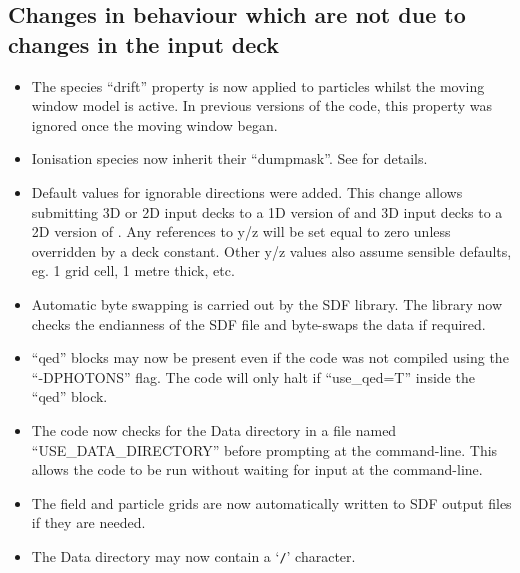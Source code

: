\subsection{Changes in behaviour which are not due to changes in the input deck}
\begin{itemize}
\item The species ``drift'' property is now applied to particles whilst the
  moving window model is active. In previous versions of the code, this
  property was ignored once the moving window began.
\item Ionisation species now inherit their ``dumpmask''. See 
  for details.
\item Default values for ignorable directions were added.
   This change allows submitting 3D or 2D input decks to a 1D
   version of {\EPOCH} and 3D input decks to a 2D version of {\EPOCH}.
   Any references to y/z will be set equal to zero unless overridden
   by a deck constant. Other y/z values also assume sensible
   defaults, eg. 1 grid cell, 1 metre thick, etc.
\item Automatic byte swapping is carried out by the SDF library.
   The library now checks the endianness of the SDF file and
   byte-swaps the data if required.
\item ``qed'' blocks may now be present even if the code was not compiled
   using the ``-DPHOTONS'' flag.
   The code will only halt if ``use\_qed=T'' inside the ``qed'' block.
\item The code now checks for the Data directory in a file named
   ``USE\_DATA\_DIRECTORY'' before prompting at the command-line. This allows
   the code to be run without waiting for input at the command-line.
\item The field and particle grids are now automatically written to SDF output
   files if they are needed.
\item The Data directory may now contain a `\verb|/|' character.
\end{itemize}

{}




